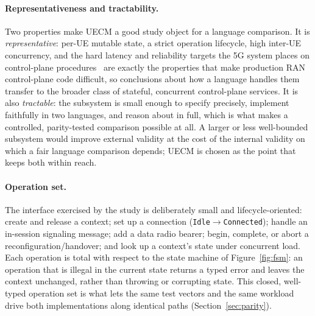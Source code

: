 \documentclass[english,twoside,openright,a4paper,censored,csm,software-track-2020]{HYthesisML}
\begin{document}
\paragraph{Representativeness and tractability.}
Two properties make UECM a good study object for a language comparison. It is
\emph{representative}: per-UE mutable state, a strict operation lifecycle, high inter-UE
concurrency, and the hard latency and reliability targets the 5G system places on control-plane
procedures~\cite{3gpp22261} are exactly the properties that make production
RAN control-plane code difficult, so conclusions about how a language handles them transfer to
the broader class of stateful, concurrent control-plane services. It is also \emph{tractable}:
the subsystem is small enough to specify precisely, implement faithfully in two languages, and
reason about in full, which is what makes a controlled, parity-tested comparison possible at
all. A larger or less well-bounded subsystem would improve external validity at the cost of the
internal validity on which a fair language comparison depends; UECM is chosen as the point that
keeps both within reach.

\paragraph{Operation set.}
The interface exercised by the study is deliberately small and lifecycle-oriented: create and
release a context; set up a connection (\texttt{Idle}$\rightarrow$\texttt{Connected}); handle an
in-session signaling message; add a data radio bearer; begin, complete, or abort a
reconfiguration/handover; and look up a context's state under concurrent load. Each operation is
total with respect to the state machine of Figure~\ref{fig:fsm}: an operation that is illegal in
the current state returns a typed error and leaves the context unchanged, rather than throwing
or corrupting state. This closed, well-typed operation set is what lets the same test vectors
and the same workload drive both implementations along identical paths
(Section~\ref{sec:parity}).
\end{document}
